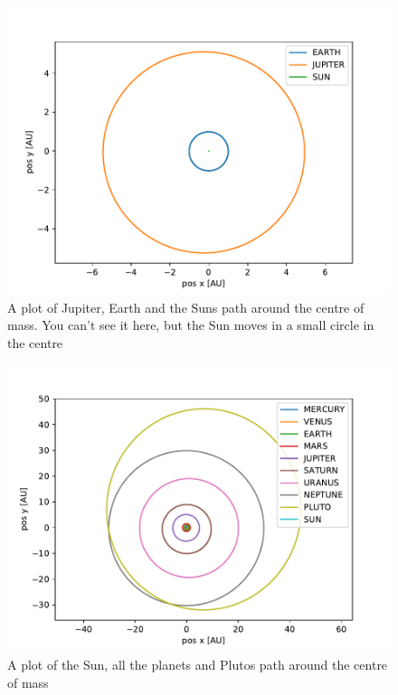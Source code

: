 \documentclass[a4paper]{article}
\begin{document}
\begin{figure}[h!]
	\centering 
	\includegraphics[scale=0.7]{../opp_f0.pdf}
	\caption{A plot of Jupiter, Earth and the Suns path around the centre of mass. You can't see it here, but the Sun moves in a small circle in the centre}
	\label{f_0}
\end{figure}

\begin{figure}[h!]
	\centering 
	\includegraphics[scale=0.7]{../opp_f1.pdf}
	\caption{A plot of the Sun, all the planets and Plutos path around the centre of mass}
	\label{f_1_0}
\end{figure}
\end{document}
